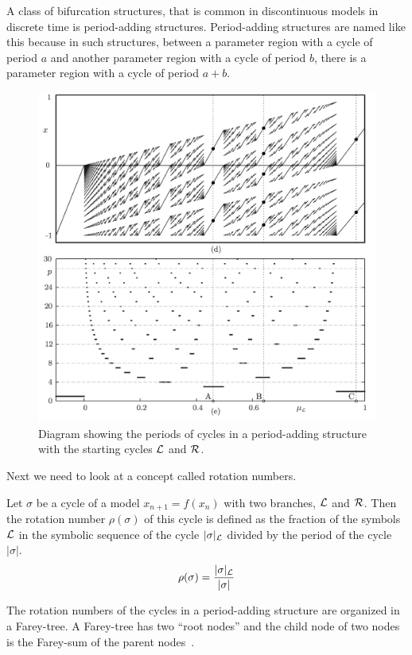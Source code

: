 A class of bifurcation structures, that is common in discontinuous models in discrete time is period-adding structures.
Period-adding structures are named like this because in such structures, between a parameter region with a cycle of period $a$ and another parameter region with a cycle of period $b$, there is a parameter region with a cycle of period $a + b$.

\begin{figure}
	\centering
	\includegraphics[width=.5 \textwidth]{../StatusMeeting/02/Figs/PeriodAddingDiagrams_Slides.png}
	\caption[Diagram of periods in a period-adding structure between $\L$ and $\R$]{
		Diagram showing the periods of cycles in a period-adding structure with the starting cycles $\L$ and $\R$.
	}
\end{figure}

Next we need to look at a concept called rotation numbers.

\begin{definition}
	Let $\sigma$ be a cycle of a model $x_{n+1} = f(x_n)$ with two branches, $\L$ and $\R$.
	Then the rotation number $\rho(\sigma)$ of this cycle is defined as the fraction of the symbols $\L$ in the symbolic sequence of the cycle $|\sigma|_{\mathcal{L}}$ divided by the period of the cycle $|\sigma|$.
	\begin{align}
		\rho(\sigma) = \dfrac{|\sigma|_{\mathcal{L}}}{|\sigma|}
	\end{align}
	\vspace{-4.5em}
	\begin{flushright}
		\cite{Keener80}
	\end{flushright}
\end{definition}

The rotation numbers of the cycles in a period-adding structure are organized in a Farey-tree.
A Farey-tree has two ``root nodes'' and the child node of two nodes is the Farey-sum of the parent nodes~\cite{granados14adding}.

